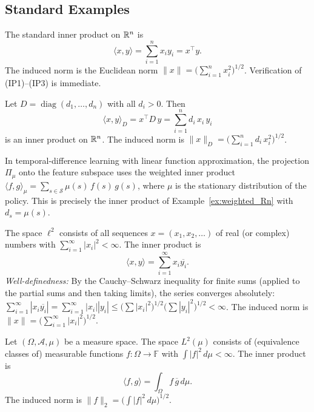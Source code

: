 \documentclass[11pt,a4paper]{article}
\begin{document}
\subsection{Standard Examples}

\begin{example}
\label{ex:Rn}
The standard inner product on $\mathbb{R}^n$ is
\[
\langle x, y \rangle = \sum_{i=1}^n x_i y_i
= x^\top y.
\]
The induced norm is the Euclidean norm
$\|x\| = \bigl(\sum_{i=1}^n x_i^2\bigr)^{1/2}$.
Verification of (IP1)--(IP3) is immediate.
\end{example}

\begin{example}
\label{ex:weighted_Rn}
Let $D = \operatorname{diag}(d_1, \ldots, d_n)$ with all $d_i > 0$. Then
\[
\langle x, y \rangle_D = x^\top D\, y = \sum_{i=1}^n d_i\, x_i\, y_i
\]
is an inner product on $\mathbb{R}^n$. The induced norm is
$\|x\|_D = \bigl(\sum_{i=1}^n d_i\, x_i^2\bigr)^{1/2}$.
\end{example}

\begin{rlconnection}[title={Weighted Inner Products in RL}]
In temporal-difference learning with linear function approximation, the
projection $\Pi_\mu$ onto the feature subspace uses the weighted inner
product $\langle f, g \rangle_\mu = \sum_{s \in \mathcal{S}} \mu(s)\,
f(s)\, g(s)$, where $\mu$ is the stationary distribution of the policy.
This is precisely the inner product of Example~\ref{ex:weighted_Rn} with
$d_s = \mu(s)$.
\end{rlconnection}

\begin{example}
\label{ex:ell2}
The space $\ell^2$ consists of all sequences $x = (x_1, x_2, \ldots)$ of
real (or complex) numbers with $\sum_{i=1}^\infty |x_i|^2 < \infty$. The
inner product is
\[
\langle x, y \rangle = \sum_{i=1}^\infty x_i \overline{y_i}.
\]
\emph{Well-definedness:} By the Cauchy--Schwarz inequality for finite sums
(applied to the partial sums and then taking limits), the series converges
absolutely:
$\sum_{i=1}^\infty |x_i \overline{y_i}|
= \sum_{i=1}^\infty |x_i| |y_i|
\le \bigl(\sum |x_i|^2\bigr)^{1/2} \bigl(\sum |y_i|^2\bigr)^{1/2}
< \infty$.
The induced norm is $\|x\| = \bigl(\sum_{i=1}^\infty |x_i|^2\bigr)^{1/2}$.
\end{example}

\begin{example}
\label{ex:L2}
Let $(\Omega, \mathcal{A}, \mu)$ be a measure space. The space
$L^2(\mu)$ consists of (equivalence classes of) measurable functions
$f \colon \Omega \to \mathbb{F}$ with $\int |f|^2\, d\mu < \infty$. The
inner product is
\[
\langle f, g \rangle = \int_\Omega f\, \overline{g}\, d\mu.
\]
The induced norm is $\|f\|_2 = \bigl(\int |f|^2\, d\mu\bigr)^{1/2}$.
\end{example}
\end{document}

